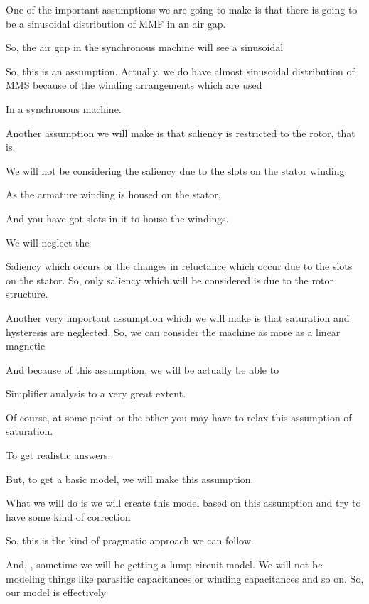 \documentclass{article}
\begin{document}
One of the important assumptions we are going to make is that there is going to be a sinusoidal distribution of MMF in an air gap.

So, the air gap in the synchronous machine will see a sinusoidal

So, this is an assumption. Actually, we do have almost sinusoidal distribution of MMS because of the winding arrangements which are used

In a synchronous machine.

Another assumption we will make is that saliency is restricted to the rotor, that is,

We will not be considering the saliency due to the slots on the stator winding.

As the armature winding is housed on the stator,

And you have got slots in it to house the windings.

We will neglect the

Saliency which occurs or the changes in reluctance which occur due to the slots on the stator. So, only saliency which will be considered is due to the rotor structure.



Another very important assumption which we will make is that saturation and hysteresis are neglected. So, we can consider the machine as more as a linear magnetic

And because of this assumption, we will be actually be able to

Simplifier analysis to a very great extent.

Of course, at some point or the other you may have to relax this assumption of saturation.

To get realistic answers.

But, to get a basic model, we will make this assumption.

What we will do is we will create this model based on this assumption and try to have some kind of correction

So, this is the kind of pragmatic approach we can follow.

And, , sometime we will be getting a lump circuit model. We will not be modeling things like parasitic capacitances or winding capacitances and so on. So, our model is effectively
\end{document}
